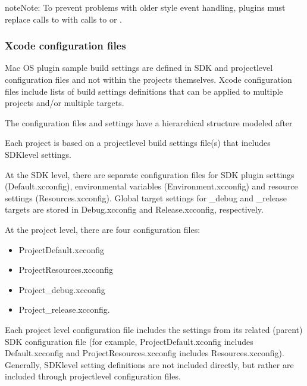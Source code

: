 \documentclass[letterpaper,12pt,english,openany,oneside]{sphinxmanual}
\begin{document}
\begin{sphinxadmonition}{note}{Note:}
To prevent problems with older style event handling, plugins must replace calls to  with calls to  or .
\end{sphinxadmonition}


\subsubsection{Xcode configuration files}
\label{\detokenize{Plugins_CreatingSimplePlug:xcode-configuration-files}}
Mac OS plugin sample build settings are defined in SDK and project\sphinxhyphen{}level configuration files and not within the projects themselves. Xcode configuration files include lists of build settings definitions that can be applied to multiple projects and/or multiple targets.

The configuration files and settings have a hierarchical structure modeled after 

Each project is based on a project\sphinxhyphen{}level build settings file(s) that includes SDK\sphinxhyphen{}level settings.

At the SDK level, there are separate configuration files for SDK plugin settings (Default.xcconfig), environmental variables (Environment.xcconfig) and resource settings (Resources.xcconfig). Global target settings for \_debug and \_release targets are stored in Debug.xcconfig and Release.xcconfig, respectively.

At the project level, there are four configuration files:
\begin{itemize}
\item {} 
ProjectDefault.xcconfig

\item {} 
ProjectResources.xcconfig

\item {} 
Project\_debug.xcconfig

\item {} 
Project\_release.xcconfig.

\end{itemize}

Each project level configuration file includes the settings from its related (parent) SDK configuration file (for example, ProjectDefault.xconfig includes Default.xcconfig and ProjectResources.xcconfig includes Resources.xcconfig). Generally, SDK\sphinxhyphen{}level setting definitions are not included directly, but rather are included through project\sphinxhyphen{}level configuration files.
\end{document}

